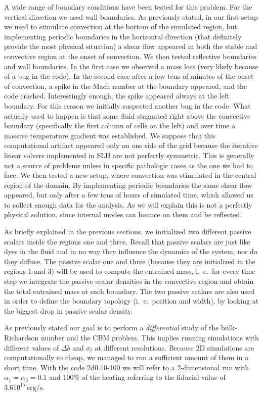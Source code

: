 A wide range of boundary conditions have been tested for this problem. For the vertical direction we used wall boundaries. As previously stated, in our first setup we used to stimulate convection at the bottom of the simulated region, but implementing periodic boundaries in the horizontal direction (that definitely provide the most physical situation) a shear flow appeared in both the stable and convective region at the onset of convection. We then tested reflective boundaries and wall boundaries. In the first case we observed a mass loss (very likely because of a bug in the code). In the second case after a few tens of minutes of the onset of convection, a spike in the Mach number at the boundary appeared, and the code crashed. Interestingly enough, the spike appeared always at the left boundary. For this reason we initially suspected another bug in the code. What actually used to happen is that some fluid stagnated right above the convective boundary (specifically the first column of cells on the left) and over time a massive temperature gradient was established. We suppose that this computational artifact appeared only on one side of the grid because the iterative linear solvers implemented in SLH are not perfectly symmetric. This is generally not a source of problems unless in specific pathologic cases as the one we had to face. We then tested a new setup, where convection was stimulated in the central region of the domain. By implementing periodic boundaries the same shear flow appeared, but only after a few tens of hours of simulated time, which allowed us to collect enough data for the analysis. As we will explain this is not a perfectly physical solution, since internal modes can bounce on them and be reflected.


As briefly explained in the previous sections, we initialized two different passive scalars inside the regions one and three. Recall that passive scalars are just like dyes in the fluid and in no way they influence the dynamics of the system, nor do they diffuse. The passive scalar one and three (because they are initialized in the regions 1 and 3) will be used to compute the entrained mass, i.\ e.\ for every time step we integrate the passive scalar densities in the convective region and obtain the total entrained mass at each boundary. The two passive scalars are also used in order to define the boundary topology (i.\ e.\  position and width), by looking at the biggest drop in passive scalar density.

As previously stated our goal is to perform a \textit{differential} study of the bulk-Richardson number and the CBM problem. This implies running simulations with different values of $\Delta b$ and $\sigma_t$ at different resolutions. Because 2D simulations are computationally so cheap, we managed to run a  sufficient amount of them in a short time. With the code 2d0.10-100 we will refer to a 2-dimensional run with $\alpha_{1} = \alpha_{3}=0.1$ and $100 \%$ of the heating referring to the fiducial value of $3.6 10^{15} \, \mathrm{erg/s}$.

